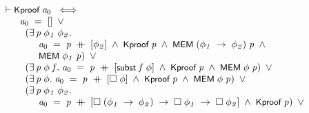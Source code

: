 \documentclass{report}
\renewcommand{\HOLConst}[1]{{\textsf{\upshape\small #1}}}
\newenvironment{holmath}{\begin{displaymath}\begin{array}{l}}{\end{array}\end{displaymath}\ignorespacesafterend}
\begin{document}
\begin{holmath}
  \ensuremath{\HOLTokenTurnstile}\HOLConst{Kproof}\;\HOLFreeVar{a\sb{\mathrm{0}}}\;\HOLSymConst{\HOLTokenEquiv{}}\\
\;\;\;\;\;\;\;\HOLFreeVar{a\sb{\mathrm{0}}}\;\HOLSymConst{=}\;[]\;\HOLSymConst{\HOLTokenDisj{}}\\
\;\;\;\;\;\;\;\;\;(\HOLSymConst{\HOLTokenExists{}}\HOLBoundVar{p}\;\HOLBoundVar{\ensuremath{\phi\sb{1}}}\;\HOLBoundVar{\ensuremath{\phi\sb{2}}}.\\
\;\;\;\;\;\;\;\;\;\;\;\;\;\;\HOLFreeVar{a\sb{\mathrm{0}}}\;\HOLSymConst{=}\;\HOLBoundVar{p}\;\HOLSymConst{\HOLTokenDoublePlus}\;[\HOLBoundVar{\ensuremath{\phi\sb{2}}}]\;\HOLSymConst{\HOLTokenConj{}}\;\HOLConst{Kproof}\;\HOLBoundVar{p}\;\HOLSymConst{\HOLTokenConj{}}\;\HOLConst{MEM}\;(\HOLBoundVar{\ensuremath{\phi\sb{1}}}\;\HOLSymConst{\ensuremath{\rightarrow}}\;\HOLBoundVar{\ensuremath{\phi\sb{2}}})\;\HOLBoundVar{p}\;\HOLSymConst{\HOLTokenConj{}}\\
\;\;\;\;\;\;\;\;\;\;\;\;\;\;\HOLConst{MEM}\;\HOLBoundVar{\ensuremath{\phi\sb{1}}}\;\HOLBoundVar{p})\;\HOLSymConst{\HOLTokenDisj{}}\\
\;\;\;\;\;\;\;\;\;(\HOLSymConst{\HOLTokenExists{}}\HOLBoundVar{p}\;\HOLBoundVar{\ensuremath{\phi}}\;\HOLBoundVar{f}.\;\HOLFreeVar{a\sb{\mathrm{0}}}\;\HOLSymConst{=}\;\HOLBoundVar{p}\;\HOLSymConst{\HOLTokenDoublePlus}\;[\HOLConst{subst}\;\HOLBoundVar{f}\;\HOLBoundVar{\ensuremath{\phi}}]\;\HOLSymConst{\HOLTokenConj{}}\;\HOLConst{Kproof}\;\HOLBoundVar{p}\;\HOLSymConst{\HOLTokenConj{}}\;\HOLConst{MEM}\;\HOLBoundVar{\ensuremath{\phi}}\;\HOLBoundVar{p})\;\HOLSymConst{\HOLTokenDisj{}}\\
\;\;\;\;\;\;\;\;\;(\HOLSymConst{\HOLTokenExists{}}\HOLBoundVar{p}\;\HOLBoundVar{\ensuremath{\phi}}.\;\HOLFreeVar{a\sb{\mathrm{0}}}\;\HOLSymConst{=}\;\HOLBoundVar{p}\;\HOLSymConst{\HOLTokenDoublePlus}\;[\HOLSymConst{\ensuremath{\Box}}\;\HOLBoundVar{\ensuremath{\phi}}]\;\HOLSymConst{\HOLTokenConj{}}\;\HOLConst{Kproof}\;\HOLBoundVar{p}\;\HOLSymConst{\HOLTokenConj{}}\;\HOLConst{MEM}\;\HOLBoundVar{\ensuremath{\phi}}\;\HOLBoundVar{p})\;\HOLSymConst{\HOLTokenDisj{}}\\
\;\;\;\;\;\;\;\;\;(\HOLSymConst{\HOLTokenExists{}}\HOLBoundVar{p}\;\HOLBoundVar{\ensuremath{\phi\sb{1}}}\;\HOLBoundVar{\ensuremath{\phi\sb{2}}}.\\
\;\;\;\;\;\;\;\;\;\;\;\;\;\;\HOLFreeVar{a\sb{\mathrm{0}}}\;\HOLSymConst{=}\;\HOLBoundVar{p}\;\HOLSymConst{\HOLTokenDoublePlus}\;[\HOLSymConst{\ensuremath{\Box}}\;(\HOLBoundVar{\ensuremath{\phi\sb{1}}}\;\HOLSymConst{\ensuremath{\rightarrow}}\;\HOLBoundVar{\ensuremath{\phi\sb{2}}})\;\HOLSymConst{\ensuremath{\rightarrow}}\;\HOLSymConst{\ensuremath{\Box}}\;\HOLBoundVar{\ensuremath{\phi\sb{1}}}\;\HOLSymConst{\ensuremath{\rightarrow}}\;\HOLSymConst{\ensuremath{\Box}}\;\HOLBoundVar{\ensuremath{\phi\sb{2}}}]\;\HOLSymConst{\HOLTokenConj{}}\;\HOLConst{Kproof}\;\HOLBoundVar{p})\;\HOLSymConst{\HOLTokenDisj{}}\\

\end{holmath}
\end{document}
